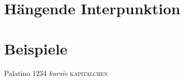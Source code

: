 \section{Hängende Interpunktion}


\section{Beispiele}

{\selectfont Palatino 1234 \emph{kursiv} \textsc{kapitälchen}}


